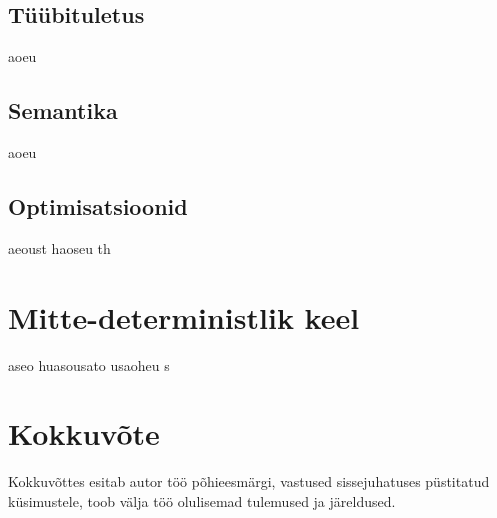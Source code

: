 \documentclass[a4paper,12pt]{article}
\renewcommand{\baselinestretch}{1.5}
\begin{document}
\subsection{Tüübituletus}
aoeu
\subsection{Semantika}
aoeu
\subsection{Optimisatsioonid}
aeoust haoseu th

\clearpage

\section{Mitte-deterministlik keel}
aseo huasousato usaoheu s

\section{Kokkuvõte}
Kokkuvõttes esitab autor töö põhieesmärgi, vastused sissejuhatuses püstitatud
küsimustele, toob välja töö olulisemad tulemused ja järeldused.


\renewcommand{\baselinestretch}{1.15}
\printbibliography[title={Kasutatud kirjandus}]
\end{document}
